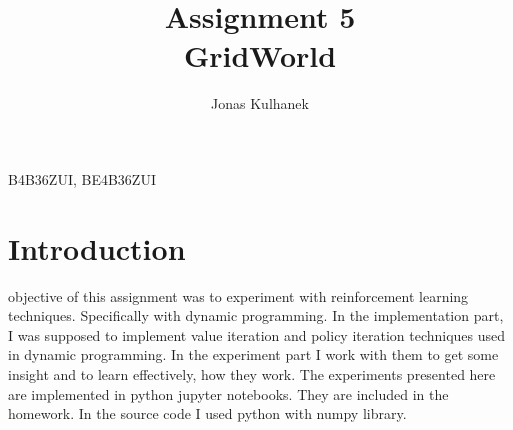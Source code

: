 \documentclass[10pt,journal,compsoc,twoside]{IEEEtran}
\begin{document}
\suppressfloats
\title{Assignment 5 \\ GridWorld}
\author{Jonas Kulhanek}
%
{B4B36ZUI, BE4B36ZUI}
\maketitle
\section{Introduction}\label{sec:introduction}
 objective of this assignment was to experiment with reinforcement learning techniques. Specifically with dynamic programming.
In the implementation part, I was supposed to implement value iteration and policy iteration techniques used in dynamic programming.
In the experiment part I work with them to get some insight and to learn effectively, how they work.
The experiments presented here are implemented in python jupyter notebooks. They are included in the homework.
In the source code I used python with numpy library.
\end{document}
